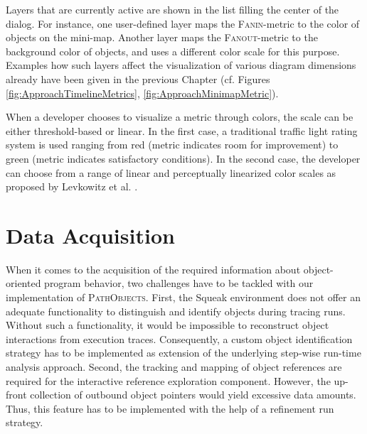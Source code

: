 Layers that are currently active are shown in the list filling the center of the dialog.
For instance, one user-defined layer maps the \textsc{Fanin}-metric to the color of objects on the mini-map.
Another layer maps the \textsc{Fanout}-metric to the background color of objects, and uses a different color scale for this purpose.
Examples how such layers affect the visualization of various diagram dimensions already have been given in the previous Chapter (cf. Figures \ref{fig:ApproachTimelineMetrics}, \ref{fig:ApproachMinimapMetric}).

When a developer chooses to visualize a metric through colors, the scale can be either threshold-based or linear.
In the first case, a traditional traffic light rating system is used ranging from red (metric indicates room for improvement) to green (metric indicates satisfactory conditions).
In the second case, the developer can choose from a range of linear and perceptually linearized color scales as proposed by Levkowitz et al. \cite{levkowitz_color_1992, levkowitz_color_1997}.

\section{Data Acquisition}
\label{s:ImplementationTracing}
When it comes to the acquisition of the required information about object-oriented program behavior, two challenges have to be tackled with our implementation of \textsc{PathObjects}.
First, the Squeak environment does not offer an adequate functionality to distinguish and identify objects during tracing runs.
Without such a functionality, it would be impossible to reconstruct object interactions from execution traces.
Consequently, a custom object identification strategy has to be implemented as extension of the underlying step-wise run-time analysis approach.
Second, the tracking and mapping of object references are required for the interactive reference exploration component.
However, the up-front collection of outbound object pointers would yield excessive data amounts.
Thus, this feature has to be implemented with the help of a refinement run strategy.

